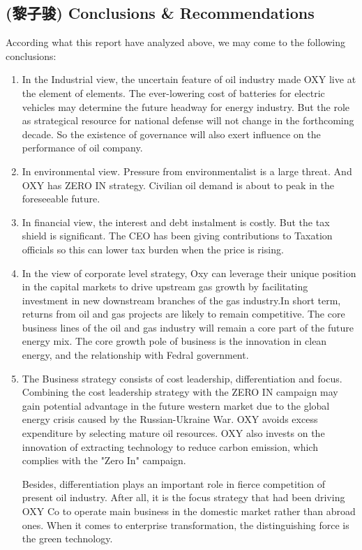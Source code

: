 \documentclass[
	a4paper, %
	12pt,%
]{CSSullivanBusinessReport}
\begin{document}
\begin{fullwidth}
\section{(黎子骏) Conclusions \& Recommendations}
According what this report have analyzed above, we may come to the following conclusions:
\begin{enumerate}
    \item In the Industrial view, the uncertain feature of oil industry made OXY live at the element of elements. The ever-lowering cost of batteries for electric vehicles may determine the future headway for energy industry. But the role as strategical resource for national defense will not change in the forthcoming decade. So the existence of governance will also exert influence on the performance of oil company. 
    \item In environmental view. Pressure from environmentalist is a large threat. And OXY has ZERO IN strategy. Civilian oil demand is about to peak in the foreseeable future.
    \item In financial view, the interest and debt instalment is costly. But the tax shield is significant. The CEO has been giving contributions to Taxation officials so this can lower tax burden when the price is rising.
    \item In the view of corporate level strategy, Oxy can leverage their unique position in the capital markets to drive upstream gas growth by facilitating investment in new downstream branches of the gas industry.In short term, returns from oil and gas projects are likely to remain competitive. The core business lines of the oil and gas industry will remain a core part of the future energy mix. The core growth pole of business is the innovation in clean energy, and the relationship with Fedral government.
    \item The Business strategy consists of cost leadership, differentiation and focus. Combining the cost leadership strategy with the ZERO IN campaign may gain potential advantage in the future western market due to the global energy crisis caused by the Russian-Ukraine War. OXY avoids excess expenditure by selecting mature oil resources. OXY also invests on the innovation of extracting technology to reduce carbon emission, which complies with the "Zero In" campaign. 
    \par
    Besides, differentiation plays an important role in fierce competition of present oil industry. After all, it is the focus strategy that had been driving OXY Co to operate main business in the domestic market rather than abroad ones. When it comes to enterprise transformation, the distinguishing force is the green technology.

\end{enumerate}
\end{fullwidth}
\end{document}
